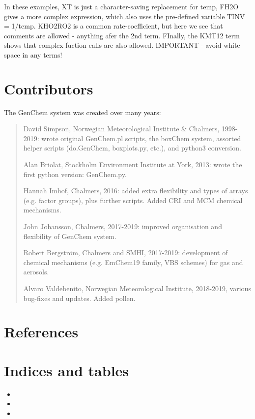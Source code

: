 \documentclass[a4paper,10pt,english]{sphinxmanual}
\begin{document}
In these examples, XT is just a character-saving replacement for temp, FH2O gives a more complex expression, which also uses the pre-defined variable TINV = 1/temp. KHO2RO2 is a common rate-coefficient, but here we see that comments are allowed - anything afer the 2nd term. FInally, the KMT12 term shows that complex fuction calls are also allowed. IMPORTANT - avoid white space in any terms!


\chapter{Contributors}
\label{\detokenize{GenChemDoc_contributors:contributors}}\label{\detokenize{GenChemDoc_contributors::doc}}
The GenChem system was created over many years:
\begin{quote}

David Simpson, Norwegian Meteorological Institute \& Chalmers,
1998-2019: wrote original GenChem.pl scripts, the
boxChem system, assorted helper scripts (do.GenChem, boxplots.py, etc.),
and python3 conversion.

Alan Briolat, Stockholm Environment Institute at York,  2013: wrote the
first python version: GenChem.py.

Hannah Imhof, Chalmers,  2016: added extra flexibility and types
of arrays (e.g. factor groups), plus further scripts.  Added
CRI and MCM chemical mechanisms.

John Johansson, Chalmers, 2017-2019: improved organisation and
flexibility of GenChem system.

Robert Bergström, Chalmers and SMHI, 2017-2019: development of
chemical mechanisms (e.g. EmChem19 family, VBS schemes) for gas and aerosols.

Alvaro Valdebenito, Norwegian Meteorological Institute, 2018-2019,
various bug-fixes and updates. Added pollen.
\end{quote}


\chapter{References}
\label{\detokenize{GenChemDoc_refs:references}}\label{\detokenize{GenChemDoc_refs::doc}}

\chapter{Indices and tables}
\label{\detokenize{index:indices-and-tables}}\begin{itemize}
\item {} 

\item {} 

\item {} 

\end{itemize}
\end{document}

